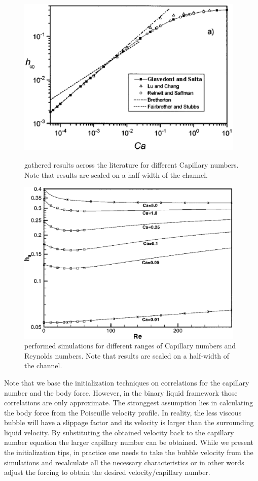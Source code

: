 \documentclass{article}
\begin{document}
\begin{figure}
\includegraphics[width=0.97\textwidth]{Figures/giavedoni_planar.eps}
\caption{\citet{giavedoni-numerical} gathered results across the
literature for different Capillary numbers. Note that results are scaled on a half-width of the
channel. \label{fig:giavedoni:planar}}
\includegraphics[width=0.97\textwidth]{Figures/heil-planar.eps}
\caption{\citet{heil-bretherton} performed simulations for different ranges of
Capillary numbers and Reynolds numbers. Note that results are scaled on a half-width of the channel.
\label{fig:heil:planar}}
\end{figure}
Note that we base the initialization techniques on correlations for the
capillary number and the body force. However, in the binary liquid framework
those correlations are only approximate. The stronggest assumption lies
in calculating the body force from the Poiseuille velocity profile.
In reality, the less viscous bubble will have a slippage
factor and its velocity is larger than the surrounding liquid velocity. By
substituting the obtained velocity back to the capillary number equation the
larger capillary number can be obtained. While we present the initialization
tips, in practice one needs to take the bubble velocity from the simulations and
recalculate all the necessary characteristics or in other words adjust the
forcing to obtain the desired velocity/capillary number.
\end{document}
